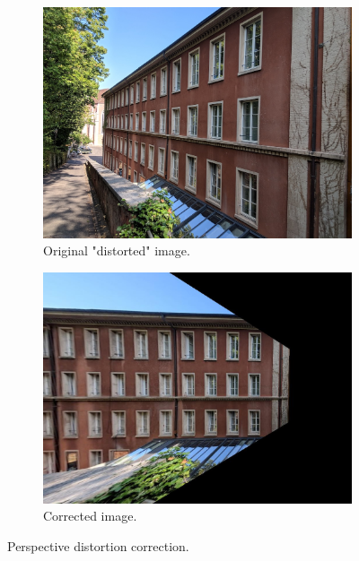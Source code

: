 \documentclass[11pt,a4paper]{article}
\begin{document}
\begin{figure}[ht]
	\centering
	\begin{subfigure}[h]{0.8\textwidth}
		\includegraphics[width=\textwidth]{PC_test_2}
		\caption{Original "distorted" image.}
		\label{fig:original}
	\end{subfigure}
	\par\medskip
	\begin{subfigure}[h]{0.8\textwidth}
		\includegraphics[width=\textwidth]{out1}
		\caption{Corrected image.}
		\label{fig:corrected}
	\end{subfigure}
	\caption{Perspective distortion correction.}
	\label{fig:correction}
\end{figure}
\end{document}
